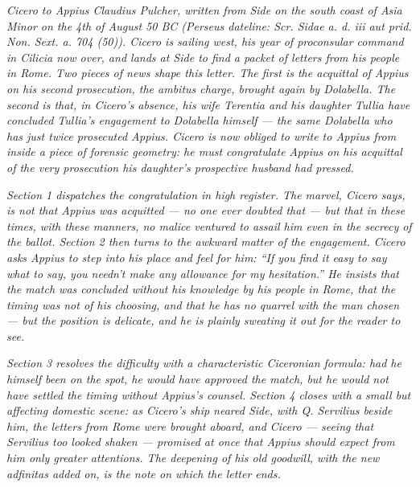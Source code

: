 
\textit{Cicero to Appius Claudius Pulcher, written from
Side on the south coast of Asia Minor on the 4th of
August 50 BC (Perseus dateline: \textit{Scr. Sidae a.
d. iii aut prid. Non. Sext. a. 704 (50)}). Cicero is
sailing west, his year of proconsular command in
Cilicia now over, and lands at Side to find a packet
of letters from his people in Rome. Two pieces of news
shape this letter. The first is the acquittal of
Appius on his second prosecution, the \textit{ambitus}
charge, brought again by Dolabella. The second is
that, in Cicero's absence, his wife Terentia and his
daughter Tullia have concluded Tullia's engagement to
Dolabella himself --- the same Dolabella who has just
twice prosecuted Appius. Cicero is now obliged to
write to Appius from inside a piece of forensic
geometry: he must congratulate Appius on his acquittal
of the very prosecution his daughter's prospective
husband had pressed.}

\textit{Section 1 dispatches the congratulation in
high register. The marvel, Cicero says, is not that
Appius was acquitted --- no one ever doubted that ---
but that in these times, with these manners, no
malice ventured to assail him even in the secrecy of
the ballot. Section 2 then turns to the awkward
matter of the engagement. Cicero asks Appius to step
into his place and feel for him: ``If you find it
easy to say what to say, you needn't make any
allowance for my hesitation.'' He insists that the
match was concluded without his knowledge by his
people in Rome, that the timing was not of his
choosing, and that he has no quarrel with the man
chosen --- but the position is delicate, and he is
plainly sweating it out for the reader to see.}

\textit{Section 3 resolves the difficulty with a
characteristic Ciceronian formula: had he himself
been on the spot, he would have approved the match,
but he would not have settled the timing without
Appius's counsel. Section 4 closes with a small but
affecting domestic scene: as Cicero's ship neared
Side, with Q. Servilius beside him, the letters from
Rome were brought aboard, and Cicero --- seeing that
Servilius too looked shaken --- promised at once that
Appius should expect from him only greater attentions.
The deepening of his old goodwill, with the new
\textit{adfinitas} added on, is the note on which the
letter ends.}
